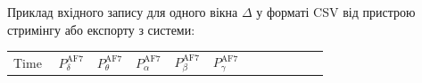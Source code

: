 \documentclass[12pt,a4paper]{article}
\begin{document}
Приклад вхідного запису для одного вікна \(\Delta\) у форматі CSV від пристрою стримінгу або експорту з системи:



{\def\LTcaptype{none} %

\begin{longtable}[]{@{}

  >{\raggedright\arraybackslash}p{0.1463\linewidth}

  >{\centering\arraybackslash}p{0.1220\linewidth}

  >{\centering\arraybackslash}p{0.1220\linewidth}

  >{\centering\arraybackslash}p{0.1220\linewidth}

  >{\centering\arraybackslash}p{0.1220\linewidth}

  >{\centering\arraybackslash}p{0.1220\linewidth}

  >{\centering\arraybackslash}p{0.1220\linewidth}

  >{\centering\arraybackslash}p{0.1220\linewidth}@{}}

\toprule\noalign{}

\begin{minipage}[b]{\linewidth}\raggedright

Time

\end{minipage} & \begin{minipage}[b]{\linewidth}\centering

\(P_\delta^{\text{AF7}}\)

\end{minipage} & \begin{minipage}[b]{\linewidth}\centering

\(P_\theta^{\text{AF7}}\)

\end{minipage} & \begin{minipage}[b]{\linewidth}\centering

\(P_\alpha^{\text{AF7}}\)

\end{minipage} & \begin{minipage}[b]{\linewidth}\centering

\(P_\beta^{\text{AF7}}\)

\end{minipage} & \begin{minipage}[b]{\linewidth}\centering

\(P_\gamma^{\text{AF7}}\)

\end{minipage} & \begin{minipage}[b]{\linewidth}\centering


\end{minipage}
\end{longtable}}
\end{document}
